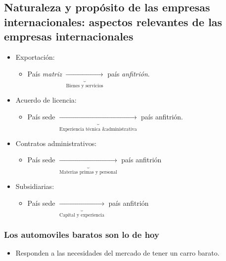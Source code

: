 \documentclass{article}
\begin{document}
\subsection{Naturaleza y propósito de las empresas internacionales: aspectos relevantes de las empresas internacionales}
\begin{itemize}
    \item Exportación: 
        \begin{itemize}
            \item País \emph{matriz} $\underbrace{\rightarrow}_{\text{Bienes y servicios}}$ país \emph{anfitrión}.
        \end{itemize}
    
    \item Acuerdo de licencia:
        \begin{itemize}
            \item País sede $\underbrace{\rightarrow}_{\text{Experiencia técnica \& administrativa}}$ país anfitrión.
        \end{itemize}
    
    \item Contratos administrativos:
        \begin{itemize}
            \item País sede $\underbrace{\rightarrow}_{\text{Materias primas y personal}}$ país anfitrión  
        \end{itemize}
    
    \item Subsidiarias:
        \begin{itemize}
            \item País sede $\underbrace{\rightarrow}_{\text{Capital y experiencia}}$ país anfitrión 
        \end{itemize}
\end{itemize}

\subsubsection{Los automoviles baratos son lo de hoy}
\begin{itemize}
    \item Responden a las necesidades del mercado de tener un carro barato.
\end{itemize}
\end{document}
